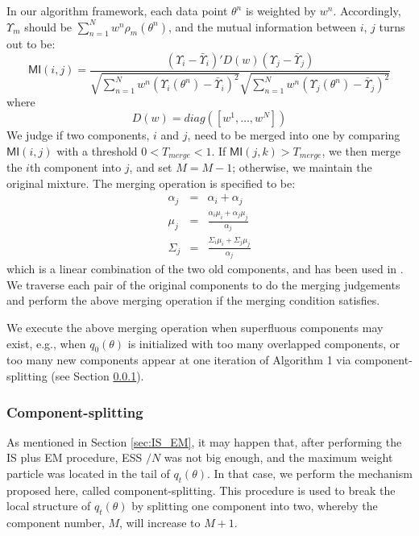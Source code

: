 \documentclass[aoas]{imsart}
\def\MI{\textsf{MI}}
\def\ESS{\textsf{ESS }}
\begin{document}
In our algorithm framework, each data point $\theta^n$ is weighted
by $w^n$. Accordingly, $\Upsilon_m$ should be $\sum_{n=1}^N w^n
\rho_m(\theta^n)$, and the mutual information between $i$, $j$ turns
out to be:
\begin{equation}\label{Merge_criterion_correlation}
\MI(i,j)=\frac{(\Upsilon_i-\bar{\Upsilon}_i)'
D(w)(\Upsilon_j-\bar{\Upsilon}_j)}{\sqrt{\sum_{n=1}^N
w^n(\Upsilon_i(\theta^{n})-\bar{\Upsilon}_i)^2}\sqrt{\sum_{n=1}^N
w^n(\Upsilon_j(\theta^{n})-\bar{\Upsilon}_j)^2}}
\end{equation}
where
\begin{equation}
D(w)=diag([w^1,\ldots,w^N])
\end{equation}
We judge if two components, $i$ and $j$, need to be merged into one
by comparing $\MI(i,j)$ with a threshold $0<T_{merge}<1$. If
$\MI(j,k)>T_{merge}$, we then merge the $i$th component into $j$,
and set $M=M-1$; otherwise, we maintain the original mixture. The
merging operation is specified to be:
\begin{eqnarray}\label{Linear_combination_components}
\alpha_{j}&=&\alpha_{i}+\alpha_{j}\\
\mu_{j}&=&\frac{\alpha_{i}\mu_{i}+\alpha_{j}\mu_{j}}{\alpha_{j}}\\
\Sigma_{j}&=&\frac{\Sigma_{i}\mu_{i}+\Sigma_{j}\mu_{j}}{\alpha_{j}}
\end{eqnarray}
which is a linear combination of the two old components, and has
been used in \cite{wang2004estimation}. We traverse each pair of the
original components to do the merging judgements and perform the
above merging operation if the merging condition satisfies.

We execute the above merging operation when superfluous components
may exist, e.g., when $q_0(\theta)$ is initialized with too many
overlapped components, or too many new components appear at one
iteration of Algorithm 1 via component-splitting (see Section
\ref{sec:split}).

\subsubsection{Component-splitting}\label{sec:split}
As mentioned in Section \ref{sec:IS_EM}, it may happen that, after
performing the IS plus EM procedure, \ESS$/N$ was not big enough,
and the maximum weight particle was located in the tail of
$q_t(\theta)$. In that case, we perform the mechanism proposed here,
called component-splitting. This procedure is used to break the
local structure of $q_t(\theta)$ by splitting one component into
two, whereby the component number, $M$, will increase to $M+1$.
\end{document}
